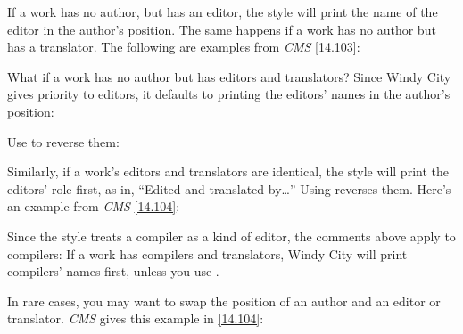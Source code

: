 \documentclass[11pt,letterpaper,oneside]{article}
\begin{document}
\begin{citebib}
\item \cite{doe2010a}
\item \cite{doe2010b}
\end{citebib}

If a work has no author, but has an editor, the style will print the
name of the editor in the author's position. The same happens if a
work has no author but has a translator. The following are examples
from \textit{CMS} \ref{14.103}:

\begin{citebib}
\item \cite[100]{egan2014}
\item \cite[34]{silverstein1974}
\end{citebib}

What if a work has no author but has editors and translators? Since
Windy City gives priority to editors, it defaults to printing the
editors' names in the author's position:

\begin{citebib}
\item \cite{smith2002a}
\end{citebib}

\noindent Use  to reverse them:

\begin{citebib}
\item \cite{smith2002b}
\end{citebib}

Similarly, if a work's editors and translators are identical, the
style will print the editors' role first, as in, ``Edited and
translated by\ldots'' Using  reverses them. Here's an
example from \textit{CMS} \ref{14.104}:

\begin{citebib}
\item \cite{menchu1999}
\end{citebib}

Since the style treats a compiler as a kind of editor, the comments
above apply to compilers: If a work has compilers and translators,
Windy City will print compilers' names first, unless you use
.

In rare cases, you may want to swap the position of an author and an
editor or translator. \textit{CMS} gives this example in \ref{14.104}:

\begin{citebib}
\item \cite{pound1953}
\end{citebib}
\end{document}
